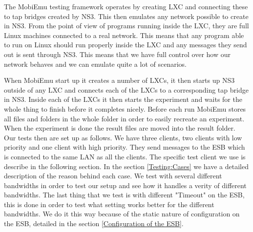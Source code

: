     The MobiEmu testing framework operates by creating \gls{LXC} and connecting these to tap bridges created by NS3. This then emulates any network possible to create in NS3. From the point of view of programs running inside the LXC, they are full Linux machines connected to a real network. This means that any program able to run on Linux should run properly inside the LXC and any messages they send out is sent through NS3. This means that we have full control over how our network behaves and we can emulate quite a lot of scenarios.
    
    When MobiEmu start up it creates a number of LXCs, it then starts up NS3 outside of any LXC and connects each of the LXCs to a corresponding tap bridge in NS3. Inside each of the LXCs it then starts the experiment and waits for the whole thing to finish before it completes nicely. Before each run MobiEmu stores all files and folders in the whole folder in order to easily recreate an experiment. When the experiment is done the result files are moved into the result folder. \\
    
    Our tests then are set up as follows. We have three clients, two clients with low priority and one client with high priority. They send messages to the ESB which is connected to the same LAN as all the clients. The specific test client we use is describe in the following section. In the section \ref{Testing:Cases} we have a detailed description of the reason behind each case. We test with several different bandwidths in order to test our setup and see how it handles a verity of different bandwidths. The last thing that we test is with different "Timeout" on the ESB, this is done in order to test what setting works better for the different bandwidths. We do it this way because of the static nature of configuration on the ESB, detailed in the section \ref{Configuration of the ESB}.
